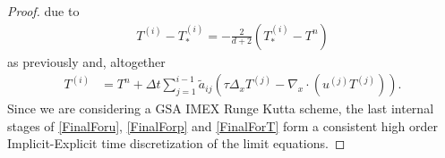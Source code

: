 \documentclass[10pt,a4paper]{amsart}
\begin{document}
\begin{proof}
due to
\begin{eqnarray*}
	T^{(i)}-T_*^{(i)} 	
	= -\frac{2}{d+2}(T_*^{(i)}  -T^n )
\end{eqnarray*}
as previously and, altogether
\begin{equation}\begin{split} \label{FinalForT}
		T^{(i)} &= T^n + \Delta t\sum_{j=1}^{i-1} \tilde{a}_{ij} \left( \tau \Delta_x T^{(j)} - \nabla_x \cdot (u^{(j)}T^{(j)}) \right).
	\end{split}
\end{equation}
Since we are considering a GSA IMEX Runge Kutta scheme, the last internal stages of \eqref{FinalForu}, \eqref{FinalForp} and \eqref{FinalForT} form a consistent high order Implicit-Explicit time discretization of the limit equations.
\end{proof}
\end{document}
